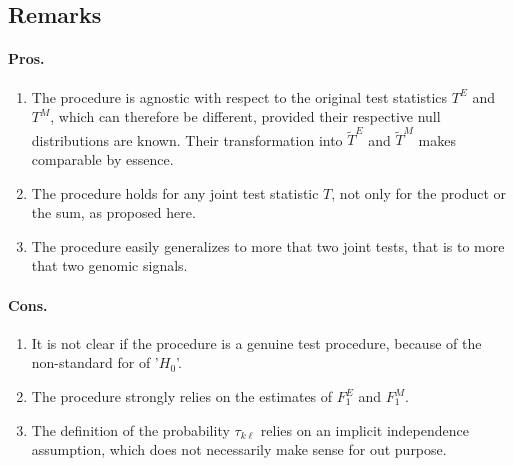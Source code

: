 \documentclass[a4paper, 11pt]{article}
\newcommand{\Tt}{\widetilde{T}}
\begin{document}
\subsection{Remarks}

\paragraph{Pros.} 
\begin{enumerate}
 \item The procedure is agnostic with respect to the original test statistics $T^E$ and $T^M$, which can therefore be different, provided their respective null distributions are known. Their transformation into $\Tt^E$ and $\Tt^M$ makes comparable by essence.
 \item The procedure holds for any joint test statistic $T$, not only for the product or the sum, as proposed here.
 \item The procedure easily generalizes to more that two joint tests, that is to more that two genomic signals.
\end{enumerate}

\paragraph{Cons.} 
\begin{enumerate}
 \item It is not clear if the procedure is a genuine test procedure, because of the non-standard for of '$H_0$'.
 \item The procedure strongly relies on the estimates of $F^E_1$ and $F^M_1$.
 \item The definition of the probability $\tau_{k\ell}$ relies on an implicit independence assumption, which does not necessarily make sense for out purpose.
\end{enumerate}




\end{document}
